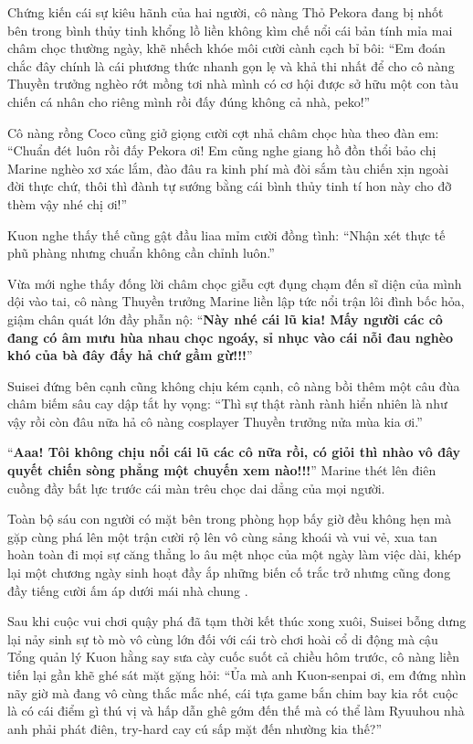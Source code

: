 \documentclass[../main.tex]{subfiles}
\begin{document}
Chứng kiến cái sự kiêu hãnh của hai người, cô nàng Thỏ Pekora đang bị nhốt bên trong bình thủy tinh khổng lồ liền không kìm chế nổi cái bản tính mỉa mai châm chọc thường ngày, khẽ nhếch khóe môi cười cành cạch bỉ bôi: ``Em đoán chắc đây chính là cái phương thức nhanh gọn lẹ và khả thi nhất để cho cô nàng Thuyền trưởng nghèo rớt mồng tơi nhà mình có cơ hội được sở hữu một con tàu chiến cá nhân cho riêng mình rồi đấy đúng không cả nhà, peko!''

Cô nàng rồng Coco cũng giở giọng cười cợt nhả châm chọc hùa theo đàn em: ``Chuẩn đét luôn rồi đấy Pekora ơi! Em cũng nghe giang hồ đồn thổi bảo chị Marine nghèo xơ xác lắm, đào đâu ra kinh phí mà đòi sắm tàu chiến xịn ngoài đời thực chứ, thôi thì đành tự sướng bằng cái bình thủy tinh tí hon này cho đỡ thèm vậy nhé chị ơi!''

Kuon nghe thấy thế cũng gật đầu liaa mỉm cười đồng tình: ``Nhận xét thực tế phũ phàng nhưng chuẩn không cần chỉnh luôn.''

Vừa mới nghe thấy đống lời châm chọc giễu cợt đụng chạm đến sĩ diện của mình dội vào tai, cô nàng Thuyền trưởng Marine liền lập tức nổi trận lôi đình bốc hỏa, giậm chân quát lớn đầy phẫn nộ: ``\textbf{Này nhé cái lũ kia! Mấy người các cô đang có âm mưu hùa nhau chọc ngoáy, sỉ nhục vào cái nỗi đau nghèo khó của bà đây đấy hả chứ gầm gừ!!!}''

Suisei đứng bên cạnh cũng không chịu kém cạnh, cô nàng bồi thêm một câu đùa châm biếm sâu cay dập tắt hy vọng: ``Thì sự thật rành rành hiển nhiên là như vậy rồi còn đâu nữa hả cô nàng cosplayer Thuyền trưởng nửa mùa kia ơi.''

``\textbf{Aaa! Tôi không chịu nổi cái lũ các cô nữa rồi, có giỏi thì nhào vô đây quyết chiến sòng phẳng một chuyến xem nào!!!}'' Marine thét lên điên cuồng đầy bất lực trước cái màn trêu chọc dai dẳng của mọi người.

Toàn bộ sáu con người có mặt bên trong phòng họp bấy giờ đều không hẹn mà gặp cùng phá lên một trận cười rộ lên vô cùng sảng khoái và vui vẻ, xua tan hoàn toàn đi mọi sự căng thẳng lo âu mệt nhọc của một ngày làm việc dài, khép lại một chương ngày sinh hoạt đầy ắp những biến cố trắc trở nhưng cũng đong đầy tiếng cười ấm áp dưới mái nhà chung \hll.

\ct

Sau khi cuộc vui chơi quậy phá đã tạm thời kết thúc xong xuôi, Suisei bỗng dưng lại nảy sinh sự tò mò vô cùng lớn đối với cái trò chơi hoài cổ di động mà cậu Tổng quản lý Kuon hằng say sưa cày cuốc suốt cả chiều hôm trước, cô nàng liền tiến lại gần khẽ ghé sát mặt gặng hỏi: ``Ủa mà anh Kuon-senpai ơi, em đứng nhìn nãy giờ mà đang vô cùng thắc mắc nhé, cái tựa game bắn chim bay kia rốt cuộc là có cái điểm gì thú vị và hấp dẫn ghê gớm đến thế mà có thể làm Ryuuhou nhà anh phải phát điên, try-hard cay cú sấp mặt đến nhường kia thế?''
\end{document}

